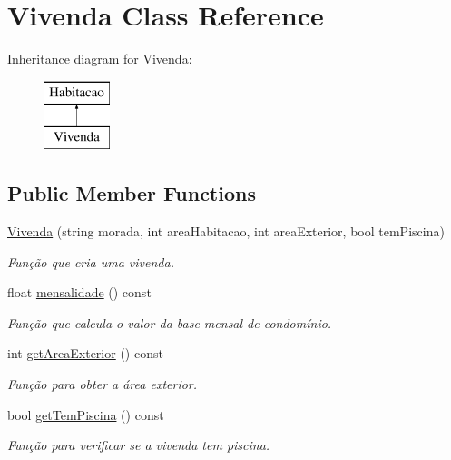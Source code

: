 \hypertarget{class_vivenda}{}\section{Vivenda Class Reference}
\label{class_vivenda}
Inheritance diagram for Vivenda\+:\begin{figure}[H]
\begin{center}
\leavevmode
\includegraphics[height=2.000000cm]{class_vivenda}
\end{center}
\end{figure}
\subsection*{Public Member Functions}
\begin{DoxyCompactItemize}
\item 
\hyperlink{class_vivenda_a55423f0f9af77c03237c80a07e9e7509}{Vivenda} (string morada, int area\+Habitacao, int area\+Exterior, bool tem\+Piscina)
\begin{DoxyCompactList}\small\item\em Função que cria uma vivenda. \end{DoxyCompactList}\item 
float \hyperlink{class_vivenda_ad542e2b2f31da8c24b706211efc880d8}{mensalidade} () const 
\begin{DoxyCompactList}\small\item\em Função que calcula o valor da base mensal de condomínio. \end{DoxyCompactList}\item 
int \hyperlink{class_vivenda_a28bc8d025d1fd0da9a49dc73d34165ef}{get\+Area\+Exterior} () const 
\begin{DoxyCompactList}\small\item\em Função para obter a área exterior. \end{DoxyCompactList}\item 
bool \hyperlink{class_vivenda_aa65508502441fffa1efa69e8708ecc85}{get\+Tem\+Piscina} () const 
\begin{DoxyCompactList}\small\item\em Função para verificar se a vivenda tem piscina. \end{DoxyCompactList}\end{DoxyCompactItemize}


